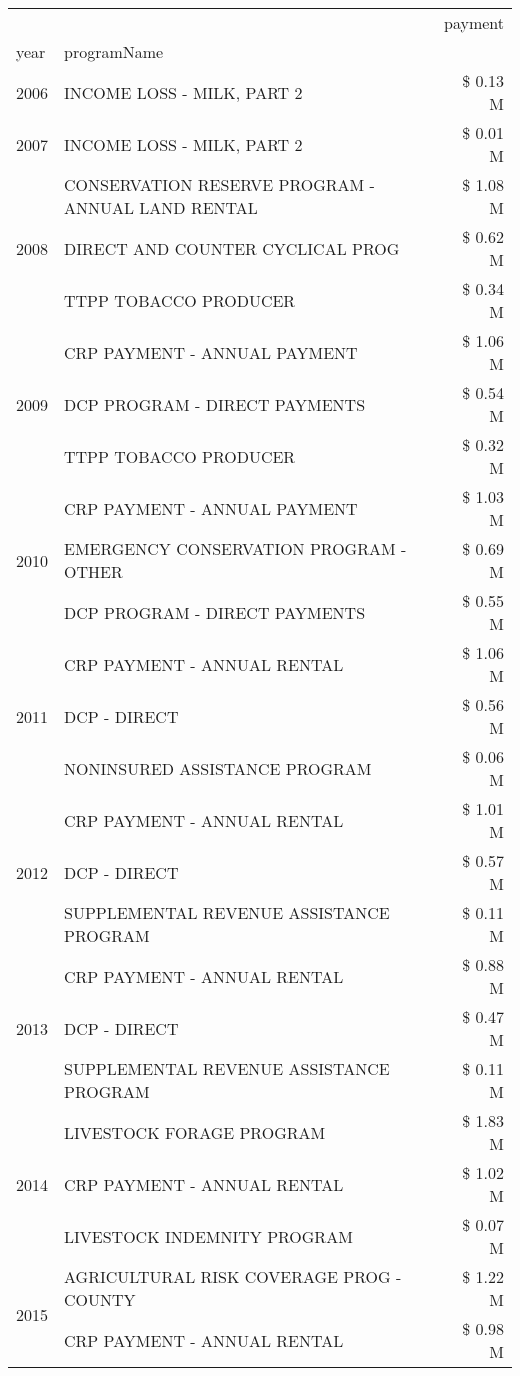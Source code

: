 \begin{tabular}{llr}
\toprule
 &  & payment \\
year & programName &  \\
\midrule
2006 & INCOME LOSS - MILK, PART 2 & \$ 0.13 M \\
\cline{1-3}
2007 & INCOME LOSS - MILK, PART 2 & \$ 0.01 M \\
\cline{1-3}
\multirow[t]{3}{*}{2008} & CONSERVATION RESERVE PROGRAM - ANNUAL LAND RENTAL & \$ 1.08 M \\
 & DIRECT AND COUNTER CYCLICAL PROG & \$ 0.62 M \\
 & TTPP TOBACCO PRODUCER & \$ 0.34 M \\
\cline{1-3}
\multirow[t]{3}{*}{2009} & CRP PAYMENT - ANNUAL PAYMENT & \$ 1.06 M \\
 & DCP PROGRAM - DIRECT PAYMENTS & \$ 0.54 M \\
 & TTPP TOBACCO PRODUCER & \$ 0.32 M \\
\cline{1-3}
\multirow[t]{3}{*}{2010} & CRP PAYMENT - ANNUAL PAYMENT & \$ 1.03 M \\
 & EMERGENCY CONSERVATION PROGRAM - OTHER & \$ 0.69 M \\
 & DCP PROGRAM - DIRECT PAYMENTS & \$ 0.55 M \\
\cline{1-3}
\multirow[t]{3}{*}{2011} & CRP PAYMENT - ANNUAL RENTAL & \$ 1.06 M \\
 & DCP - DIRECT & \$ 0.56 M \\
 & NONINSURED ASSISTANCE PROGRAM & \$ 0.06 M \\
\cline{1-3}
\multirow[t]{3}{*}{2012} & CRP PAYMENT - ANNUAL RENTAL & \$ 1.01 M \\
 & DCP - DIRECT & \$ 0.57 M \\
 & SUPPLEMENTAL REVENUE ASSISTANCE PROGRAM & \$ 0.11 M \\
\cline{1-3}
\multirow[t]{3}{*}{2013} & CRP PAYMENT - ANNUAL RENTAL & \$ 0.88 M \\
 & DCP - DIRECT & \$ 0.47 M \\
 & SUPPLEMENTAL REVENUE ASSISTANCE PROGRAM & \$ 0.11 M \\
\cline{1-3}
\multirow[t]{3}{*}{2014} & LIVESTOCK FORAGE PROGRAM & \$ 1.83 M \\
 & CRP PAYMENT - ANNUAL RENTAL & \$ 1.02 M \\
 & LIVESTOCK INDEMNITY PROGRAM & \$ 0.07 M \\
\cline{1-3}
\multirow[t]{3}{*}{2015} & AGRICULTURAL RISK COVERAGE PROG - COUNTY & \$ 1.22 M \\
 & CRP PAYMENT - ANNUAL RENTAL & \$ 0.98 M \\

\end{tabular}
